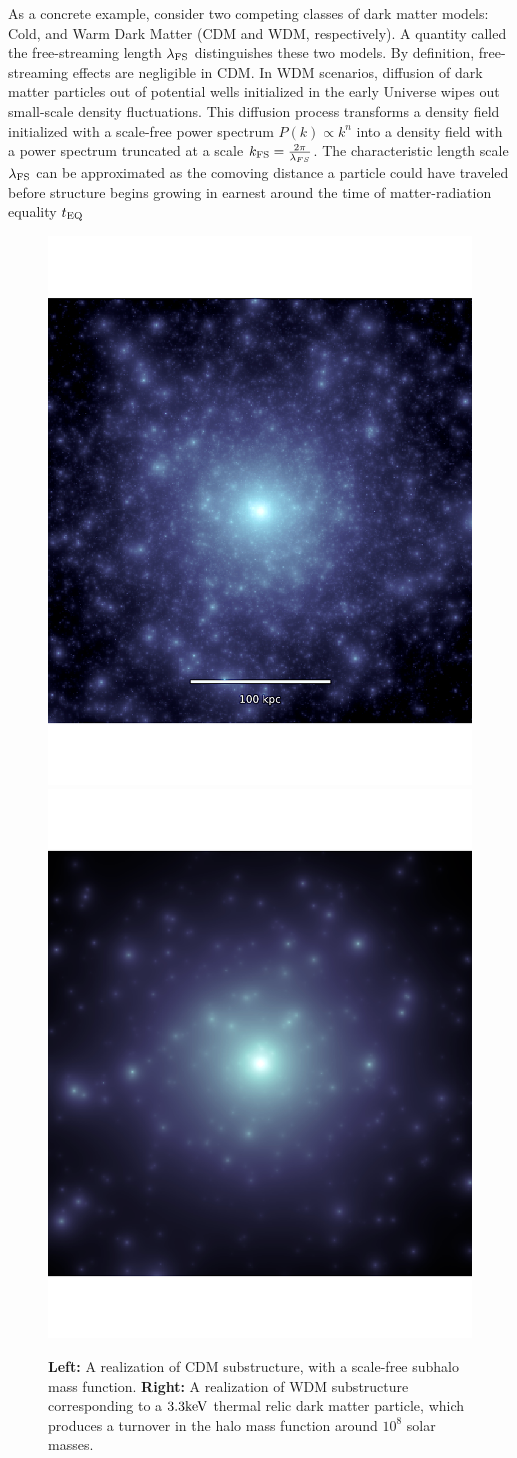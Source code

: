 As a concrete example, consider two competing classes of dark matter models: Cold, and Warm Dark Matter (CDM and WDM, respectively). A quantity called the free-streaming length $\lambda_{\rm{FS}}$ distinguishes these two models. By definition, free-streaming effects are negligible in CDM. In WDM scenarios, diffusion of dark matter particles out of potential wells initialized in the early Universe wipes out small-scale density fluctuations. This diffusion process transforms a density field initialized with a scale-free power spectrum $P\left(k\right) \propto k^{n}$ into a density field with a power spectrum truncated at a scale $k_{\rm{FS}} = \frac{2 \pi}{\lambda_{FS}}$. The characteristic length scale $\lambda_{\rm{FS}}$ can be approximated as the comoving distance a particle could have traveled before structure begins growing in earnest around the time of matter-radiation equality $t_{\rm{EQ}}$ \citep{Schneider++12} 
\begin{figure}
	\centering
	\includegraphics[clip,trim=0cm 0cm 0cm
	0cm,width=.49\textwidth,keepaspectratio]{./figures_introduction/CDMscreenshot_edited.pdf}
	\includegraphics[clip,trim=0cm 0cm 0cm
	0cm,width=.49\textwidth,keepaspectratio]{./figures_introduction/WDMrealization_nobar.pdf}
	\caption[CDM and WDM subhalo populations]{\label{fig:wdmrealization} {\bf{Left:}} A realization of CDM substructure, with a scale-free subhalo mass function. {\bf{Right:}} A realization of WDM substructure corresponding to a $3.3 \rm{keV}$ thermal relic dark matter particle, which produces a turnover in the halo mass function around $10^8$ solar masses. }
\end{figure}

